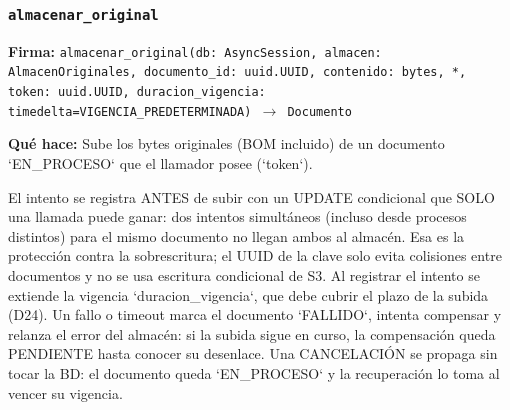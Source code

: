 \documentclass[11pt,a4paper]{article}
\begin{document}
\subsubsection*{\texttt{almacenar\_original}}
\textbf{Firma:} \texttt{almacenar\_original(db: AsyncSession, almacen: AlmacenOriginales, documento\_id: uuid.UUID, contenido: bytes, *, token: uuid.UUID, duracion\_vigencia: timedelta=VIGENCIA\_PREDETERMINADA) $\rightarrow$ Documento}

\textbf{Qué hace:} Sube los bytes originales (BOM incluido) de un documento `EN\_PROCESO` que el
llamador posee (`token`).

El intento se registra ANTES de subir con un UPDATE condicional que SOLO una llamada
puede ganar: dos intentos simultáneos (incluso desde procesos distintos) para el mismo
documento no llegan ambos al almacén. Esa es la protección contra la sobrescritura; el
UUID de la clave solo evita colisiones entre documentos y no se usa escritura condicional
de S3. Al registrar el intento se extiende la vigencia `duracion\_vigencia`, que debe
cubrir el plazo de la subida (D24). Un fallo o timeout marca el documento `FALLIDO`,
intenta compensar y relanza el error del almacén: si la subida sigue en curso, la
compensación queda PENDIENTE hasta conocer su desenlace. Una CANCELACIÓN se propaga sin
tocar la BD: el documento queda `EN\_PROCESO` y la recuperación lo toma al vencer su
vigencia.
\end{document}
